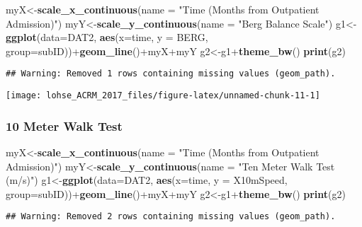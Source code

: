 \documentclass[]{article}
\newenvironment{Shaded}{\begin{snugshade}}{\end{snugshade}}
\newcommand{\KeywordTok}[1]{\textcolor[rgb]{0.13,0.29,0.53}{\textbf{{#1}}}}
\newcommand{\DataTypeTok}[1]{\textcolor[rgb]{0.13,0.29,0.53}{{#1}}}
\newcommand{\StringTok}[1]{\textcolor[rgb]{0.31,0.60,0.02}{{#1}}}
\newcommand{\NormalTok}[1]{{#1}}
\begin{document}
\begin{Shaded}
\begin{Highlighting}[]
\NormalTok{myX<-}\KeywordTok{scale_x_continuous}\NormalTok{(}\DataTypeTok{name =} \StringTok{"Time (Months from Outpatient Admission)"}\NormalTok{)}
\NormalTok{myY<-}\KeywordTok{scale_y_continuous}\NormalTok{(}\DataTypeTok{name =} \StringTok{"Berg Balance Scale"}\NormalTok{)}
\NormalTok{g1<-}\KeywordTok{ggplot}\NormalTok{(}\DataTypeTok{data=}\NormalTok{DAT2, }\KeywordTok{aes}\NormalTok{(}\DataTypeTok{x=}\NormalTok{time, }\DataTypeTok{y =} \NormalTok{BERG, }\DataTypeTok{group=}\NormalTok{subID))+}\KeywordTok{geom_line}\NormalTok{()+myX+myY}
\NormalTok{g2<-g1+}\KeywordTok{theme_bw}\NormalTok{()}
\KeywordTok{print}\NormalTok{(g2)}
\end{Highlighting}
\end{Shaded}

\begin{verbatim}
## Warning: Removed 1 rows containing missing values (geom_path).
\end{verbatim}

\begin{center}\texttt{[image: lohse\_ACRM\_2017\_files/figure-latex/unnamed-chunk-11-1]} \end{center}

\newpage

\subsubsection{10 Meter Walk Test}\label{meter-walk-test}

\begin{Shaded}
\begin{Highlighting}[]
\NormalTok{myX<-}\KeywordTok{scale_x_continuous}\NormalTok{(}\DataTypeTok{name =} \StringTok{"Time (Months from Outpatient Admission)"}\NormalTok{)}
\NormalTok{myY<-}\KeywordTok{scale_y_continuous}\NormalTok{(}\DataTypeTok{name =} \StringTok{"Ten Meter Walk Test (m/s)"}\NormalTok{)}
\NormalTok{g1<-}\KeywordTok{ggplot}\NormalTok{(}\DataTypeTok{data=}\NormalTok{DAT2, }\KeywordTok{aes}\NormalTok{(}\DataTypeTok{x=}\NormalTok{time, }\DataTypeTok{y =} \NormalTok{X10mSpeed, }\DataTypeTok{group=}\NormalTok{subID))+}\KeywordTok{geom_line}\NormalTok{()+myX+myY}
\NormalTok{g2<-g1+}\KeywordTok{theme_bw}\NormalTok{()}
\KeywordTok{print}\NormalTok{(g2)}
\end{Highlighting}
\end{Shaded}

\begin{verbatim}
## Warning: Removed 2 rows containing missing values (geom_path).
\end{verbatim}
\end{document}
